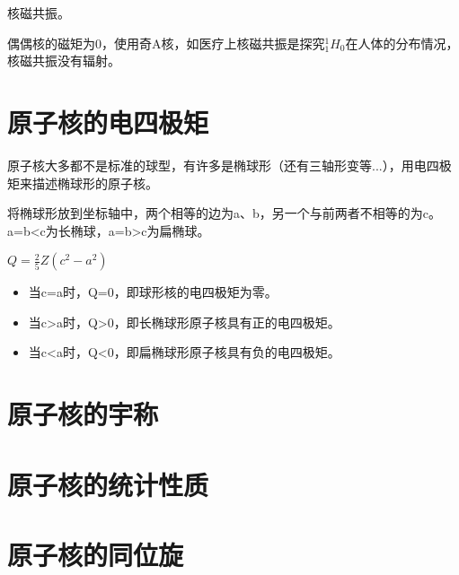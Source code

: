 核磁共振。

偶偶核的磁矩为0，使用奇A核，如医疗上核磁共振是探究$^1_1H_0$在人体的分布情况，核磁共振没有辐射。

\section{原子核的电四极矩}

原子核大多都不是标准的球型，有许多是椭球形（还有三轴形变等...），用电四极矩来描述椭球形的原子核。

将椭球形放到坐标轴中，两个相等的边为a、b，另一个与前两者不相等的为c。a=b<c为长椭球，a=b>c为扁椭球。

$Q=\frac{2}{5}Z(c^2-a^2)$

\begin{itemize}
    \item 当c=a时，Q=0，即球形核的电四极矩为零。
    \item 当c>a时，Q>0，即长椭球形原子核具有正的电四极矩。
    \item 当c<a时，Q<0，即扁椭球形原子核具有负的电四极矩。
\end{itemize}

\section{原子核的宇称}

\section{原子核的统计性质}

\section{原子核的同位旋}

\clearpage